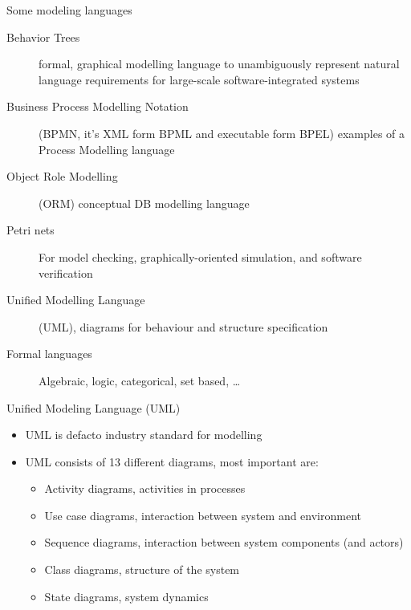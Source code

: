 \documentclass[slidetop,mathserif,red]{beamer}
\begin{document}
\begin{frame}{Some modeling languages}
        \begin{description}
        \item [Behavior Trees]  formal, graphical modelling language to unambiguously represent natural language requirements for large-scale software-integrated systems

        \item [Business Process Modelling Notation]  (BPMN, it's XML form BPML and executable form BPEL) examples of a Process Modelling language

        \item [Object Role Modelling] (ORM) conceptual DB modelling language

        \item [Petri nets] For model checking, graphically-oriented simulation, and software verification

        \item [Unified Modelling Language] (UML), diagrams for behaviour and structure specification

        \item[Formal languages] Algebraic, logic, categorical, set based, \ldots
        \end{description}
\end{frame}

 \begin{frame}{Unified Modeling Language (UML)}
    \begin{itemize}
    \item UML is defacto industry standard for modelling

    \item UML consists of 13 different diagrams, most important are:
        \begin{itemize}
        \item Activity diagrams, activities in processes
        \item Use case diagrams, interaction between system and environment
        \item Sequence diagrams, interaction between system components (and actors)
        \item Class diagrams, structure of the system
        \item State diagrams, system dynamics
        \end{itemize}
    \end{itemize}
\end{frame}
\end{document}
